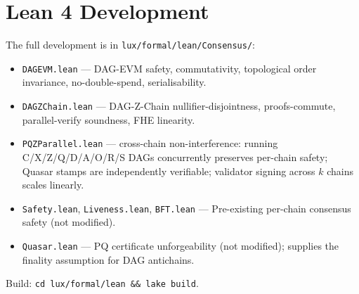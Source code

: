 \section{Lean 4 Development}

\label{sec:lean}

The full development is in \texttt{lux/formal/lean/Consensus/}:

\begin{itemize}
  \item \texttt{DAGEVM.lean} — DAG-EVM safety, commutativity, topological
    order invariance, no-double-spend, serialisability.
  \item \texttt{DAGZChain.lean} — DAG-Z-Chain nullifier-disjointness,
    proofs-commute, parallel-verify soundness, FHE linearity.
  \item \texttt{PQZParallel.lean} — cross-chain non-interference: running
    C/X/Z/Q/D/A/O/R/S DAGs concurrently preserves per-chain safety;
    Quasar stamps are independently verifiable; validator signing across
    $k$ chains scales linearly.
  \item \texttt{Safety.lean}, \texttt{Liveness.lean}, \texttt{BFT.lean} —
    Pre-existing per-chain consensus safety (not modified).
  \item \texttt{Quasar.lean} — PQ certificate unforgeability (not
    modified); supplies the finality assumption for DAG antichains.
\end{itemize}

Build: \texttt{cd lux/formal/lean \&\& lake build}.

